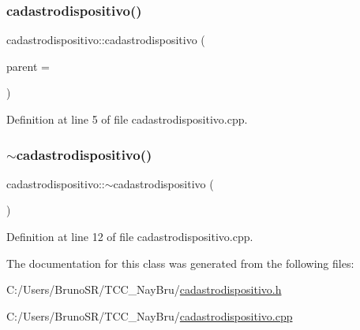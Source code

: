 \subsubsection{\texorpdfstring{cadastrodispositivo()}{cadastrodispositivo()}}
{\footnotesize\ttfamily cadastrodispositivo\+::cadastrodispositivo (\begin{DoxyParamCaption}\item[{Q\+Widget $\ast$}]{parent = {} }\end{DoxyParamCaption})\hspace{0.3cm}{\ttfamily [explicit]}}



Definition at line 5 of file cadastrodispositivo.\+cpp.

\hypertarget{classcadastrodispositivo_a21c4cb426f58445706d55dbce57f4aa0}{}\label{classcadastrodispositivo_a21c4cb426f58445706d55dbce57f4aa0} 
\subsubsection{\texorpdfstring{$\sim$cadastrodispositivo()}{~cadastrodispositivo()}}
{\footnotesize\ttfamily cadastrodispositivo\+::$\sim$cadastrodispositivo (\begin{DoxyParamCaption}{ }\end{DoxyParamCaption})}



Definition at line 12 of file cadastrodispositivo.\+cpp.



The documentation for this class was generated from the following files\+:\begin{DoxyCompactItemize}
\item 
C\+:/\+Users/\+Bruno\+S\+R/\+T\+C\+C\+\_\+\+Nay\+Bru/\hyperlink{cadastrodispositivo_8h}{cadastrodispositivo.\+h}\item 
C\+:/\+Users/\+Bruno\+S\+R/\+T\+C\+C\+\_\+\+Nay\+Bru/\hyperlink{cadastrodispositivo_8cpp}{cadastrodispositivo.\+cpp}\end{DoxyCompactItemize}
